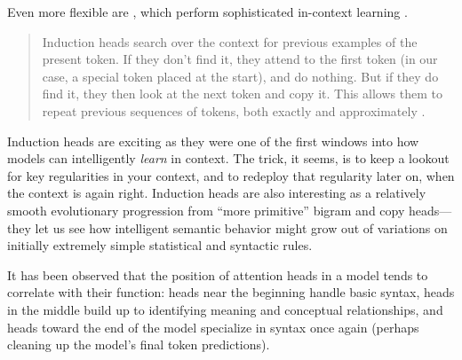 Even more flexible are , which perform sophisticated
in-context learning \cite{elhage2021mathematical,olsson2022context}.

\begin{quote}
Induction heads search over the context for previous examples of the present
token. If they don't find it, they attend to the first token (in our case, a
special token placed at the start), and do nothing. But if they do find it,
they then look at the next token and copy it. This allows them to repeat
previous sequences of tokens, both exactly and approximately
\cite{elhage2021mathematical}.
\end{quote}

Induction heads are exciting as they were one of the first windows into how
models can intelligently \emph{learn} in context. The trick, it seems, is to
keep a lookout for key regularities in your context, and to redeploy that
regularity later on, when the context is again right. Induction heads are also
interesting as a relatively smooth evolutionary progression from ``more
primitive'' bigram and copy heads---they let us see how intelligent semantic
behavior might grow out of variations on initially extremely simple statistical
and syntactic rules.

It has been observed that the position of attention heads in a model tends to
correlate with their function: heads near the beginning handle basic syntax,
heads in the middle build up to identifying meaning and conceptual
relationships, and heads toward the end of the model specialize in syntax once
again (perhaps cleaning up the model's final token predictions).



